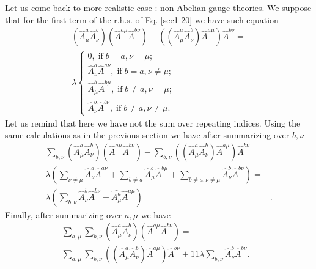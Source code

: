 \documentclass[a4paper,a4paper]{article}
\begin{document}
Let us come back to more realistic case : non-Abelian gauge 
theories. We suppose that for the first term of the r.h.s. of 
Eq. \eqref{sec1-20} we have such equation 
\begin{equation}
\begin{split}
\left (
\hat A^a_\mu \hat A^b_\nu
\right )
\left (
\hat A^{a\mu} \hat A^{b\nu}
\right ) - 
\left (
  \left (
  \hat A^a_\mu \hat A^b_\nu
  \right ) \hat A^{a\mu}
\right ) \hat A^{b\nu} = \\
\lambda 
  \begin{cases}
    0 , \; \text{if} \; b =a , \nu = \mu ; \\
    \hat{A}^a_\nu \hat{A}^{a \nu} , \; \text{if} \; b = a , \nu \neq \mu ; \\
    \hat{A}^b_\mu \hat{A}^{b \mu} , \; \text{if} \; b \neq a , \nu = \mu ; \\
    \hat{A}^b_\nu \hat{A}^{b \nu} , \; \text{if} \; 
    b \neq a , \nu \neq \mu .
  \end{cases}   
\label{sec4-10b}
\end{split}
\end{equation}
Let us remind that here we have not the sum over repeating indices. 
Using the same calculations as in the previous section we have after 
summarizing over $b, \nu$ 
\begin{equation}
\begin{split}
\sum_{b, \nu} 
  \left (
  \hat A^a_\mu \hat A^b_\nu
  \right )
  \left (
  \hat A^{a\mu} \hat A^{b\nu}
  \right ) - 
  \sum_{b, \nu} 
  \left( \left( \hat A^a_\mu \hat A^b_\nu \right ) 
  \hat A^{a\mu} \right ) \hat A^{b\nu} = & \\
\lambda 
\left(
    \sum_{\nu \neq \mu} \hat{A}^a_\nu \hat{A}^{a \nu} + 
    \sum_{b \neq a} \hat{A}^b_\mu \hat{A}^{b \mu} + 
    \sum_{b \neq a , \nu \neq \mu} \hat{A}^b_\nu \hat{A}^{b\nu} 
\right) = & \\
\lambda 
\left(
\sum_{b , \nu} \hat{A}^b_\nu \hat{A}^{b\nu} - 
\hat{A^a_\mu} \hat{A}^{a \mu} 
\right) & . 
\label{sec4-10c}
\end{split}
\end{equation}
Finally, after summarizing over $a, \mu$ we have 
\begin{equation}
\begin{split}
\sum_{a, \mu} \sum_{b, \nu} 
  \left (
  \hat A^a_\mu \hat A^b_\nu
  \right )
  \left (
  \hat A^{a\mu} \hat A^{b\nu}
  \right ) = & \\
\sum_{a, \mu} \sum_{b, \nu} 
  \left( \left( \hat A^a_\mu \hat A^b_\nu \right ) 
  \hat A^{a\mu} \right ) \hat A^{b\nu} + 
11 \lambda   
\sum_{b , \nu} \hat{A}^b_\nu \hat{A}^{b\nu} . 
\label{sec4-10d}
\end{split}
\end{equation}
\end{document}
